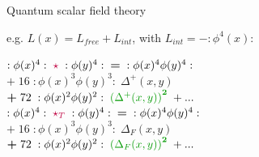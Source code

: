 \documentclass[a4paper,11pt]{beamer} %
\begin{document}
\begin{frame}
\begin{block}{Quantum scalar field theory}
\begin{setstretch}{1.4}
\begin{tiny}
\begin{center}
e.g. \; $L(x) = L_{free} + L_{int}$, \; with \; $L_{int} = - :\phi^4(x):$ 
\end{center}
\vspace{-7mm}
\begin{multicols}{2}
\begin{center}
$:\phi(x)^4: \; \begin{color}{purple}\star\end{color} \; :\phi(y)^4: \;  \textbf{=}  \; :\phi(x)^4 \phi(y)^4 :$ \\ 
$\textbf{+} \; 16 \; :\phi(x)^3 \phi(y)^3: \; \Delta^{+}(x,y)$ \\ 
$\textbf{+} \; 72 \; :\phi(x)^2 \phi(y)^2: \; \begin{color}{green!60!black}\left( \Delta^{+}(x,y) \right)^{\textbf{2}}\end{color} \; + ...$   \\
$:\phi(x)^4: \; \begin{color}{purple}\star_{T}\end{color} \; :\phi(y)^4: \;  \textbf{=}  \; :\phi(x)^4 \phi(y)^4 :$ \\ 
$\textbf{+} \; 16 \; :\phi(x)^3 \phi(y)^3: \; \Delta_F(x,y)$ \\ 
$\textbf{+} \; 72 \; :\phi(x)^2 \phi(y)^2: \; \begin{color}{green!60!black}\left( \Delta_F(x,y) \right)^{\textbf{2}}\end{color} \; + ...$ 
\end{center}
\end{multicols}
\end{tiny}
\end{setstretch}
\end{block}
\end{frame} 
\end{document}
